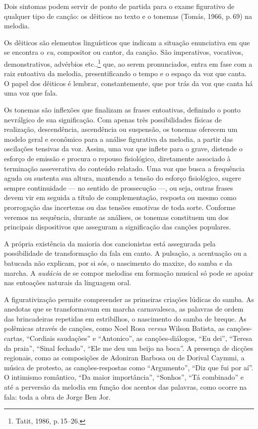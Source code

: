 Dois sintomas podem servir de ponto de partida para o exame figurativo
de qualquer tipo de canção: os dêiticos no texto e o tonemas (Tomás,
1966, p.\,69) na melodia.

Os dêiticos são elementos linguísticos que indicam a situação
enunciativa em que se encontra o \textit{eu}, compositor ou cantor, da canção.
São imperativos, vocativos, demonstrativos, advérbios etc.,\footnote{Tatit, 1986, p.\,15--26.} que, ao serem pronunciados, entra em fase com a raiz
entoativa da melodia, presentificando o tempo e o espaço da voz que
canta. O papel dos dêiticos é lembrar, constantemente, que por trás da
voz que canta há uma voz que fala.

Os tonemas são inflexões que finalizam as frases entoativas, definindo o
ponto nevrálgico de sua significação. Com apenas três possibilidades
físicas de realização, descendência, ascendência ou suspensão, os
tonemas oferecem um modelo geral e econômico para a análise figurativa
da melodia, a partir das oscilações tensivas da voz. Assim, uma voz que
inflete para o grave, distende o esforço de emissão e procura o repouso
fisiológico, diretamente associado à terminação asseverativa do conteúdo
relatado. Uma voz que busca a frequência aguda ou sustenta sua altura,
mantendo a tensão do esforço fisiológico, sugere sempre continuidade --- no
sentido de prossecução ---, ou seja, outras frases devem vir em seguida a
título de complementação, resposta ou mesmo como prorrogação das
incertezas ou das tensões emotivas de toda sorte. Conforme veremos na
sequência, durante as análises, os tonemas constituem um dos principais
dispositivos que asseguram a significação das canções populares.

A própria existência da maioria dos cancionistas está assegurada pela
possibilidade de transformação da fala em canto. A pulsação, a
acentuação ou a batucada não explicam, por si sós, o nascimento do
maxixe, do samba e da marcha. A \textit{audácia} de se compor melodias em
formação musical só pode se apoiar nas entoações naturais da linguagem
oral.

A figurativização permite compreender as primeiras criações lúdicas do
samba. As anedotas que se transformavam em marcha carnavalesca, as
palavras de ordem das brincadeiras repetidas em estribilhos, o
nascimento do samba de breque. As polêmicas através de canções, como Noel
Rosa \textit{versus} Wilson Batista, as canções-cartas, ``Cordiais saudações'' e
``Antonico'', as canções-diálogos, ``Eu dei'', ``Teresa da praia'', ``Sinal fechado'',
``Ele me deu um beijo na boca''. A presença de dicções regionais, como as composições de Adoniran Barbosa ou de Dorival Caymmi, a música de
protesto, as canções-respostas como ``Argumento'', ``Diz que fui por aí''. O
intimismo romântico, ``Da maior importância'', ``Sonhos'', ``Tá combinado'' e até a
perversão da melodia em função dos acentos das palavras, como ocorre na
fala: toda a obra de Jorge Ben Jor.

